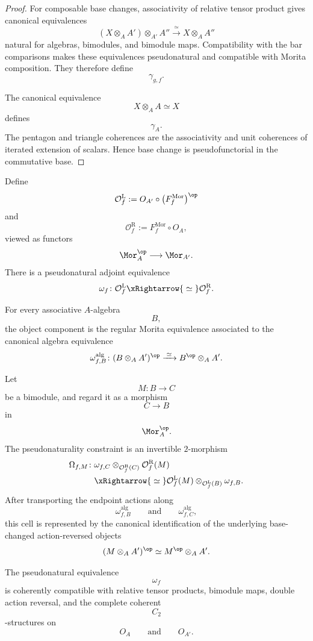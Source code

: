\begin{proof}
For composable base changes, associativity of relative tensor product
gives canonical equivalences
\[
    (X\otimes_A A')\otimes_{A'}A''
    \xrightarrow{\;\simeq\;}
    X\otimes_A A''
\]
natural for algebras, bimodules, and bimodule maps. Compatibility with
the bar comparisons makes these equivalences pseudonatural and
compatible with Morita composition. They therefore define
\[
    \gamma_{g,f}.
\]

The canonical equivalence
\[
    X\otimes_A A
    \simeq
    X
\]
defines
\[
    \gamma_A.
\]
The pentagon and triangle coherences are the associativity and unit
coherences of iterated extension of scalars. Hence base change is
pseudofunctorial in the commutative base.
\end{proof}

\begin{proposition}
\label{prop:base-change-opposites}
Define
\[
    \mathcal O_f^{\mathrm L}
    :=
    O_{A'}
    \circ
    \bigl(F_f^{\mathrm{Mor}}\bigr)^{\op}
\]
and
\[
    \mathcal O_f^{\mathrm R}
    :=
    F_f^{\mathrm{Mor}}
    \circ
    O_A,
\]
viewed as functors
\[
    \Mor_A^{\op}
    \longrightarrow
    \Mor_{A'}.
\]
There is a pseudonatural adjoint equivalence
\[
    \omega_f
    \colon
    \mathcal O_f^{\mathrm L}
    \xRightarrow{\;\simeq\;}
    \mathcal O_f^{\mathrm R}.
\]

For every associative $A$-algebra
\[
    B,
\]
the object component is the regular Morita equivalence associated to the
canonical algebra equivalence
\[
    \omega_{f,B}^{\mathrm{alg}}
    \colon
    (B\otimes_A A')^{\op}
    \xrightarrow{\;\simeq\;}
    B^{\op}\otimes_A A'.
\]

Let
\[
    M
    \colon
    B
    \longrightarrow
    C
\]
be a bimodule, and regard it as a morphism
\[
    C
    \longrightarrow
    B
\]
in
\[
    \Mor_A^{\op}.
\]
The pseudonaturality constraint is an invertible $2$-morphism
\[
\begin{aligned}
    \Omega_{f,M}
    \colon{}&
    \omega_{f,C}
    \otimes_{\mathcal O_f^{\mathrm R}(C)}
    \mathcal O_f^{\mathrm R}(M)
    \\
    &\xRightarrow{\;\simeq\;}
    \mathcal O_f^{\mathrm L}(M)
    \otimes_{\mathcal O_f^{\mathrm L}(B)}
    \omega_{f,B}.
\end{aligned}
\]
After transporting the endpoint actions along
\[
    \omega_{f,B}^{\mathrm{alg}}
    \qquad\text{and}\qquad
    \omega_{f,C}^{\mathrm{alg}},
\]
this cell is represented by the canonical identification of the
underlying base-changed action-reversed objects
\[
    (M\otimes_A A')^{\op}
    \simeq
    M^{\op}\otimes_A A'.
\]

The pseudonatural equivalence
\[
    \omega_f
\]
is coherently compatible with relative tensor products, bimodule maps,
double action reversal, and the complete coherent
\[
    C_2
\]
-structures on
\[
    O_A
    \qquad\text{and}\qquad
    O_{A'}.
\]
\end{proposition}

